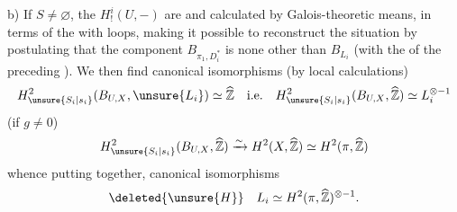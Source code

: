 b) If $S\ne\varnothing$, the $H^i_!(U,-)$ are 
and calculated by Galois-theoretic means, in terms
of the   with loops, making it possible to reconstruct
the situation
by postulating that the component $B_{\pi_1,D_i^{*}}$
is none other than $B_{L_i}$ (with the
 of the preceding ). We
then find canonical isomorphisms (by local calculations)
\[
H^2_{\unsure{S_i|s_i}}(B_{U,X},\unsure{L_i})\simeq\widehat{\mathbb Z}
\quad\text{i.e.}\quad
H^2_{\unsure{S_i|s_i}}(B_{U,X},\widehat{\mathbb Z})\simeq L_i^{\otimes-1}
\]
(if $g\ne0$)
\[
H^2_{\unsure{S_i|s_i}}(B_{U,X},\widehat{\mathbb Z})
\xrightarrow{\sim}H^2(X,\widehat{\mathbb Z})
\simeq H^2(\pi,\widehat{\mathbb Z})
\]
whence   putting together, canonical
isomorphisms
\[
\deleted{\unsure{H}}\quad L_i\simeq H^2(\pi,\widehat{\mathbb Z})^{\otimes-1}.
\]
